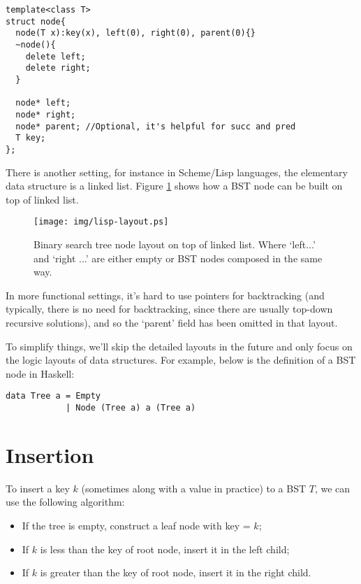 \documentclass{article}
\begin{document}
\lstset{language=C++}
\begin{lstlisting}
template<class T>
struct node{
  node(T x):key(x), left(0), right(0), parent(0){}
  ~node(){
    delete left;
    delete right;
  }

  node* left;
  node* right;
  node* parent; //Optional, it's helpful for succ and pred
  T key;
};
\end{lstlisting}

There is another setting, for instance in Scheme/Lisp languages, the elementary
data structure is a linked list. Figure \ref{fig:lisp-layout} shows how a BST node can be built on top of linked list.

\begin{figure}[htbp]
       \begin{center}
        \texttt{[image: img/lisp-layout.ps]}
        \caption{Binary search tree node layout on top of linked list. Where `left...' and `right ...' are either empty or BST nodes composed in the same way.} \label{fig:lisp-layout}
       \end{center}
\end{figure}

In more functional settings, it's hard to use pointers for backtracking (and typically, there is no need for backtracking, since there are usually top-down recursive solutions), and so the `parent' field has been omitted in that layout.

To simplify things, we'll skip the detailed layouts in the future and only
focus on the logic layouts of data structures. For example, below is the definition
of a BST node in Haskell:

\lstset{language=Haskell}
\begin{lstlisting}
data Tree a = Empty
            | Node (Tree a) a (Tree a)
\end{lstlisting}

\section{Insertion}

To insert a key $k$ (sometimes along with a value in practice) to a BST $T$, we can use the following algorithm:

\begin{itemize}
\item If the tree is empty, construct a leaf node with key = $k$;
\item If $k$ is less than the key of root node, insert it in the left child;
\item If $k$ is greater than the key of root node, insert it in the right child.
\end{itemize}
\end{document}
